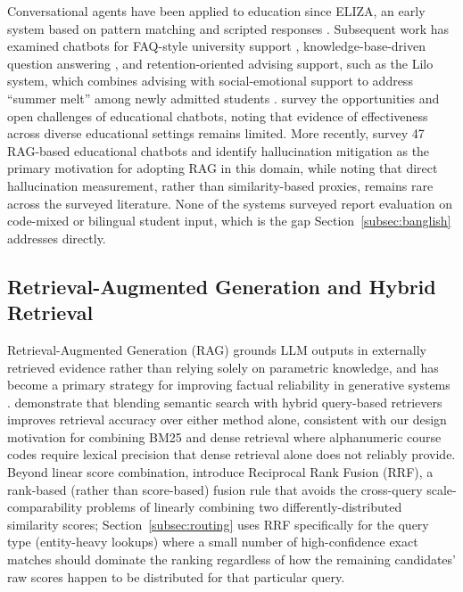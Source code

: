 \documentclass[a4paper,twoside]{article}
\begin{document}
Conversational agents have been applied to education since ELIZA, an early system based on pattern matching and scripted responses \citep{adamopoulou2021}. Subsequent work has examined chatbots for FAQ-style university support \citep{elashmawi2023}, knowledge-base-driven question answering \citep{formica2023}, and retention-oriented advising support, such as the Lilo system, which combines advising with social-emotional support to address ``summer melt'' among newly admitted students \citep{nguyen2023lilo}. \citet{hwang2021} survey the opportunities and open challenges of educational chatbots, noting that evidence of effectiveness across diverse educational settings remains limited. More recently, \citet{swacha2025} survey 47 RAG-based educational chatbots and identify hallucination mitigation as the primary motivation for adopting RAG in this domain, while noting that direct hallucination measurement, rather than similarity-based proxies, remains rare across the surveyed literature. None of the systems surveyed report evaluation on code-mixed or bilingual student input, which is the gap Section~\ref{subsec:banglish} addresses directly.

\subsection{Retrieval-Augmented Generation and Hybrid Retrieval}

Retrieval-Augmented Generation (RAG) grounds LLM outputs in externally retrieved evidence rather than relying solely on parametric knowledge, and has become a primary strategy for improving factual reliability in generative systems \citep{lewis2020}. \citet{sawarkar2024} demonstrate that blending semantic search with hybrid query-based retrievers improves retrieval accuracy over either method alone, consistent with our design motivation for combining BM25 and dense retrieval where alphanumeric course codes require lexical precision that dense retrieval alone does not reliably provide. Beyond linear score combination, \citet{cormack2009} introduce Reciprocal Rank Fusion (RRF), a rank-based (rather than score-based) fusion rule that avoids the cross-query scale-comparability problems of linearly combining two differently-distributed similarity scores; Section~\ref{subsec:routing} uses RRF specifically for the query type (entity-heavy lookups) where a small number of high-confidence exact matches should dominate the ranking regardless of how the remaining candidates' raw scores happen to be distributed for that particular query.
\end{document}
